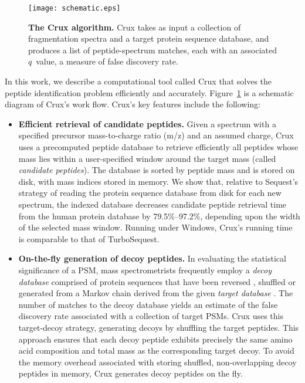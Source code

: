 \documentclass[12pt]{article}
\begin{document}
\begin{figure}
\centering
\texttt{[image: schematic.eps]}
\caption{{\bf The Crux algorithm.}  Crux takes as input a collection
  of fragmentation spectra and a target protein sequence database, and
  produces a list of peptide-spectrum matches, each with an associated
  $q$~value, a measure of false discovery rate. 
  \label{figure:crux}}
\end{figure}

In this work, we describe a computational tool called Crux that solves
the peptide identification problem efficiently and accurately.
Figure~\ref{figure:crux} is a schematic diagram of Crux's work flow.
Crux's key features include the following:

\begin{itemize}
\item {\bf Efficient retrieval of candidate peptides.}  Given a
  spectrum with a specified precursor mass-to-charge ratio (m/z) and
  an assumed charge, Crux uses a precomputed peptide database to
  retrieve efficiently all peptides whose mass lies within a
  user-specified window around the target mass (called {\em candidate
  peptides}).  The database is sorted by peptide mass and is stored on
  disk, with mass indices stored in memory.  We show that, relative to
  {\sc Sequest}'s strategy of reading the protein sequence database
  from disk for each new spectrum, the indexed database decreases
  candidate peptide retrieval time from the human protein database by
  79.5\%--97.2\%, depending upon the width of the selected mass
  window.  Running under Windows, Crux's running time is comparable to
  that of Turbo{\sc Sequest}.

\item {\bf On-the-fly generation of decoy peptides.}  In evaluating
  the statistical significance of a PSM, mass spectrometrists
  frequently employ a {\em decoy database} comprised of protein
  sequences that have been reversed \cite{moore:qscore}, shuffled
  \cite{klammer:effects} or generated from a Markov chain derived from
  the given {\em target database} \cite{colinge:olav}.  The number of
  matches to the decoy database yields an estimate of the false
  discovery rate associated with a collection of target PSMs.  Crux
  uses this target-decoy strategy, generating decoys by shuffling the
  target peptides.  This approach ensures that each decoy peptide
  exhibits precisely the same amino acid composition and total mass as
  the corresponding target decoy.  To avoid the memory overhead
  associated with storing shuffled, non-overlapping decoy peptides in
  memory, Crux generates decoy peptides on the fly.


\end{itemize}
\end{document}

